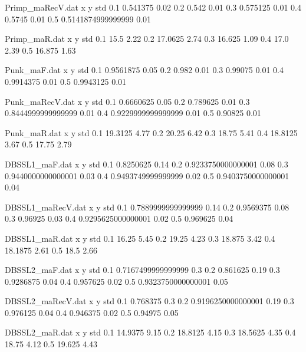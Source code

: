 \begin{filecontents}{Primp_maRecV.dat}
x y std
0.1 0.541375 0.02
0.2 0.542 0.01
0.3 0.575125 0.01
0.4 0.5745 0.01
0.5 0.5141874999999999 0.01
\end{filecontents}
\begin{filecontents}{Primp_maR.dat}
x y std
0.1 15.5 2.22
0.2 17.0625 2.74
0.3 16.625 1.09
0.4 17.0 2.39
0.5 16.875 1.63
\end{filecontents}
\begin{filecontents}{Punk_maF.dat}
x y std
0.1 0.9561875 0.05
0.2 0.982 0.01
0.3 0.99075 0.01
0.4 0.9914375 0.01
0.5 0.9943125 0.01
\end{filecontents}
\begin{filecontents}{Punk_maRecV.dat}
x y std
0.1 0.6660625 0.05
0.2 0.789625 0.01
0.3 0.8444999999999999 0.01
0.4 0.9229999999999999 0.01
0.5 0.90825 0.01
\end{filecontents}
\begin{filecontents}{Punk_maR.dat}
x y std
0.1 19.3125 4.77
0.2 20.25 6.42
0.3 18.75 5.41
0.4 18.8125 3.67
0.5 17.75 2.79
\end{filecontents}
\begin{filecontents}{DBSSL1_maF.dat}
x y std
0.1 0.8250625 0.14
0.2 0.9233750000000001 0.08
0.3 0.9440000000000001 0.03
0.4 0.9493749999999999 0.02
0.5 0.9403750000000001 0.04
\end{filecontents}
\begin{filecontents}{DBSSL1_maRecV.dat}
x y std
0.1 0.7889999999999999 0.14
0.2 0.9569375 0.08
0.3 0.96925 0.03
0.4 0.9295625000000001 0.02
0.5 0.969625 0.04
\end{filecontents}
\begin{filecontents}{DBSSL1_maR.dat}
x y std
0.1 16.25 5.45
0.2 19.25 4.23
0.3 18.875 3.42
0.4 18.1875 2.61
0.5 18.5 2.66
\end{filecontents}
\begin{filecontents}{DBSSL2_maF.dat}
x y std
0.1 0.7167499999999999 0.3
0.2 0.861625 0.19
0.3 0.9286875 0.04
0.4 0.957625 0.02
0.5 0.9323750000000001 0.05
\end{filecontents}
\begin{filecontents}{DBSSL2_maRecV.dat}
x y std
0.1 0.768375 0.3
0.2 0.9196250000000001 0.19
0.3 0.976125 0.04
0.4 0.946375 0.02
0.5 0.94975 0.05
\end{filecontents}
\begin{filecontents}{DBSSL2_maR.dat}
x y std
0.1 14.9375 9.15
0.2 18.8125 4.15
0.3 18.5625 4.35
0.4 18.75 4.12
0.5 19.625 4.43
\end{filecontents}